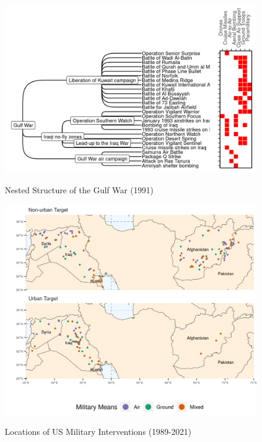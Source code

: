 \documentclass[fleqn,12pt]{article}
\begin{document}
\clearpage
{}
\newpage
\begin{figure}[h]
	\begin{center}
		\caption{Nested Structure of the Gulf War (1991)}
		{\includegraphics[width = \textwidth]{fig-nested-1.png}}
		\label{fig:fig-nested-1}
		\vspace{0.1 in}
	\end{center}
\end{figure}

\clearpage
{}
\newpage
\begin{figure}[h]
	\begin{center}
		\caption{Locations of US Military Interventions (1989-2021)}
		{\includegraphics[width = \textwidth]{fig-map-1.png}}
		\label{fig:fig-map-1}
		\vspace{0.1 in}
	\end{center}
\end{figure}
\end{document}
